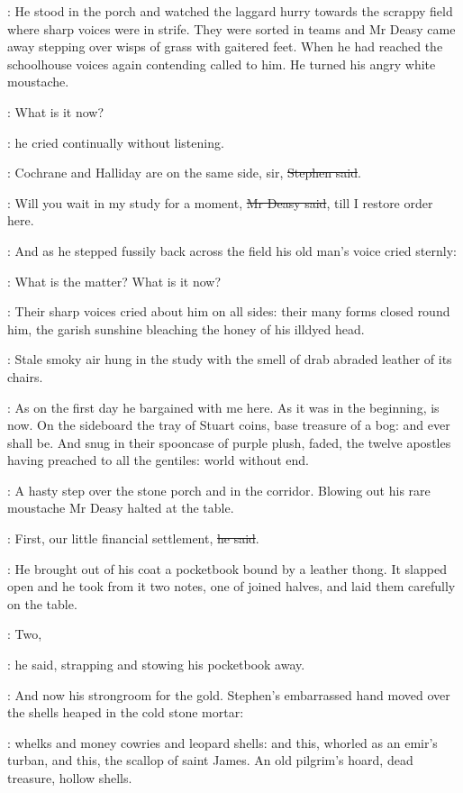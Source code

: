 :
He stood in the porch and watched the laggard hurry towards the scrappy field
where sharp voices were in strife.
They were sorted in teams
and Mr Deasy came away stepping over wisps of grass with gaitered feet.
When he had reached the schoolhouse
voices again contending called to him.
He turned his angry white moustache.

\deasy:
What is it now?

:
he cried continually without listening.

\Stephen:
Cochrane and Halliday are on the same side, sir,
\sout{Stephen said}.

\deasy:
Will you wait in my study for a moment, \sout{Mr Deasy said},
till I restore order here.


:
And as he stepped fussily back across the field
his old man's voice cried sternly:

\deasy:
What is the matter?
What is it now?

:
Their sharp voices cried about him on all sides:
their many forms closed round him,
the garish sunshine bleaching the honey of his illdyed head.

:
Stale smoky air hung in the study
with the smell of drab abraded leather of its chairs.

\StephenInt:
As on the first day he bargained with me here.
As it was in the beginning, is now.
On the sideboard the tray of Stuart coins, base treasure of a bog:
and ever shall be.
And snug in their spooncase of purple plush, faded,
the twelve apostles having preached to all the gentiles:
world without end.

:
A hasty step over the stone porch and in the corridor.
Blowing out his rare moustache
Mr Deasy halted at the table.

\deasy:
First, our little financial settlement, \sout{he said}.

:
He brought out of his coat a pocketbook bound by a leather thong.
It slapped open and he took from it two notes, one of joined halves,
and laid them carefully on the table.

\deasy:
Two,

:
he said, strapping and stowing his pocketbook away.

:
And now his strongroom for the gold.
Stephen's embarrassed hand moved over the shells heaped in the cold stone mortar:

\StephenInt:
whelks and money cowries and leopard shells:
and this, whorled as an emir's turban,
and this, the scallop of saint James.
An old pilgrim's hoard, dead treasure, hollow shells.

